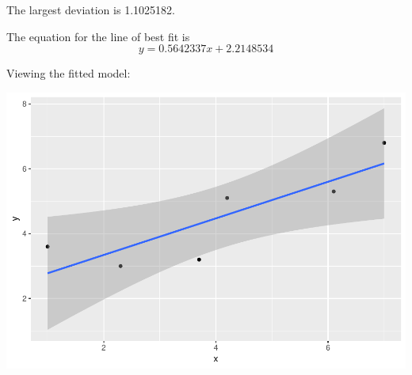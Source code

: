 \documentclass[]{article}
\begin{document}
The largest deviation is 1.1025182.

The equation for the line of best fit is \begin{equation*}
y = 0.5642337x + 2.2148534
\end{equation*}

Viewing the fitted model:

\includegraphics{Joshua_Sturm_Homework3_files/figure-latex/unnamed-chunk-4-1.pdf}
\end{document}
